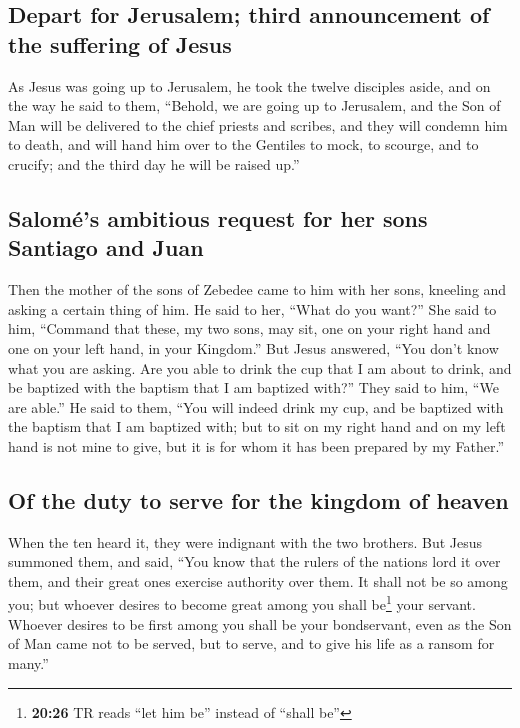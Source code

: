 \hypertarget{depart-for-jerusalem-third-announcement-of-the-suffering-of-jesus}{%
\subsection{Depart for Jerusalem; third announcement of the suffering of
Jesus}\label{depart-for-jerusalem-third-announcement-of-the-suffering-of-jesus}}

 As Jesus was going up to Jerusalem, he took the twelve
disciples aside, and on the way he said to them, 
``Behold, we are going up to Jerusalem, and the Son of Man will be
delivered to the chief priests and scribes, and they will condemn him to
death,  and will hand him over to the Gentiles to mock,
to scourge, and to crucify; and the third day he will be raised up.''

\hypertarget{salomuxe9s-ambitious-request-for-her-sons-santiago-and-juan}{%
\subsection{Salomé's ambitious request for her sons Santiago and
Juan}\label{salomuxe9s-ambitious-request-for-her-sons-santiago-and-juan}}

 Then the mother of the sons of Zebedee came to him with
her sons, kneeling and asking a certain thing of him.  He
said to her, ``What do you want?'' She said to him, ``Command that
these, my two sons, may sit, one on your right hand and one on your left
hand, in your Kingdom.''  But Jesus answered, ``You don't
know what you are asking. Are you able to drink the cup that I am about
to drink, and be baptized with the baptism that I am baptized with?''
They said to him, ``We are able.''  He said to them,
``You will indeed drink my cup, and be baptized with the baptism that I
am baptized with; but to sit on my right hand and on my left hand is not
mine to give, but it is for whom it has been prepared by my Father.''

\hypertarget{of-the-duty-to-serve-for-the-kingdom-of-heaven}{%
\subsection{Of the duty to serve for the kingdom of
heaven}\label{of-the-duty-to-serve-for-the-kingdom-of-heaven}}

 When the ten heard it, they were indignant with the two
brothers.  But Jesus summoned them, and said, ``You know
that the rulers of the nations lord it over them, and their great ones
exercise authority over them.  It shall not be so among
you; but whoever desires to become great among you shall be\footnote{\textbf{20:26}
  TR reads ``let him be'' instead of ``shall be''} your servant.
 Whoever desires to be first among you shall be your
bondservant,  even as the Son of Man came not to be
served, but to serve, and to give his life as a ransom for many.''

